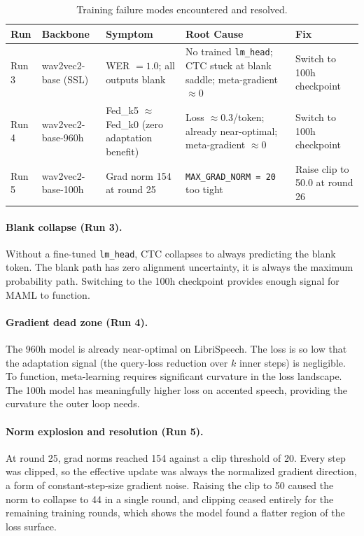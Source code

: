 \documentclass[12pt]{article}
\theoremstyle{plain}
\begin{document}
\begin{table}[H]
\centering
\caption{Training failure modes encountered and resolved.}
\label{tab:failures}
\begin{tabular}{p{1.4cm} p{2.4cm} p{3.0cm} p{3.2cm} p{2.4cm}}
\toprule
\textbf{Run} & \textbf{Backbone} & \textbf{Symptom} & \textbf{Root Cause} & \textbf{Fix} \\
\midrule
Run 3 & wav2vec2-base (SSL) &
  WER $= 1.0$; all outputs blank &
  No trained \texttt{lm\_head}; CTC stuck at blank saddle; meta-gradient $\approx 0$ &
  Switch to 100h checkpoint \\
\midrule
Run 4 & wav2vec2-base-960h &
  Fed\_k5 $\approx$ Fed\_k0 (zero adaptation benefit) &
  Loss $\approx 0.3$/token; already near-optimal; meta-gradient $\approx 0$ &
  Switch to 100h checkpoint \\
\midrule
Run 5 & wav2vec2-base-100h &
  Grad norm 154 at round 25 &
  \texttt{MAX\_GRAD\_NORM = 20} too tight &
  Raise clip to 50.0 at round 26 \\
\bottomrule
\end{tabular}
\end{table}

\paragraph{Blank collapse (Run 3).}
Without a fine-tuned \texttt{lm\_head}, CTC collapses to always predicting
the blank token. The blank path has zero alignment
uncertainty, it is always the maximum probability path.
Switching to the 100h checkpoint provides enough signal for MAML to function.

\paragraph{Gradient dead zone (Run 4).}
The 960h model is already near-optimal on LibriSpeech. The loss is so low
that the adaptation signal (the query-loss reduction over $k$ inner steps)
is negligible.
To function, meta-learning requires significant curvature in the loss landscape.
The 100h model has meaningfully higher loss on accented speech, providing the
curvature the outer loop needs.

\paragraph{Norm explosion and resolution (Run 5).}
At round 25, grad norms reached 154 against a clip threshold of 20.
Every step was clipped, so the effective update was always the normalized
gradient direction, a form of constant-step-size gradient noise.
Raising the clip to 50 caused the norm to collapse to 44 in a single round,
and clipping ceased entirely for the remaining training rounds, which shows the model
found a flatter region of the loss surface.
\end{document}
